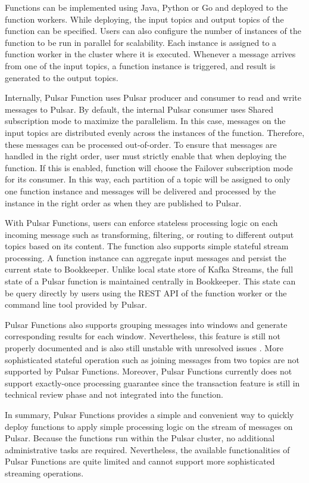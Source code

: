 Functions can be implemented using Java, Python or Go and deployed to the function workers. While deploying, the input topics and output topics of the function can be specified. Users can also configure the number of instances of the function to be run in parallel for scalability. Each instance is assigned to a function worker in the cluster where it is executed. Whenever a message arrives from one of the input topics, a function instance is triggered, and result is generated to the output topics. 

Internally, Pulsar Function uses Pulsar producer and consumer to read and write messages to Pulsar. By default, the internal Pulsar consumer uses Shared subscription mode to maximize the parallelism. In this case, messages on the input topics are distributed evenly across the instances of the function. Therefore, these messages can be processed out-of-order. To ensure that messages are handled in the right order, user must strictly enable that when deploying the function. If this is enabled, function will choose the Failover subscription mode for its consumer. In this way, each partition of a topic will be assigned to only one function instance and messages will be delivered and processed by the instance in the right order as when they are published to Pulsar.  

With Pulsar Functions, users can enforce stateless processing logic on each incoming message such as transforming, filtering, or routing to different output topics based on its content. The function also supports simple stateful stream processing. A function instance can aggregate input messages and persist the current state to Bookkeeper. Unlike local state store of Kafka Streams, the full state of a Pulsar function is maintained centrally in Bookkeeper. This state can be query directly by users using the REST API of the function worker or the command line tool provided by Pulsar.

Pulsar Functions also supports grouping messages into windows and generate corresponding results for each window. Nevertheless, this feature is still not properly documented and is also still unstable with unresolved issues \cite{pulsarfunctionissue}. More sophisticated stateful operation such as joining messages from two topics are not supported by Pulsar Functions. Moreover, Pulsar Functions currently does not support exactly-once processing guarantee since the transaction feature is still in technical review phase and not integrated into the function.

In summary, Pulsar Functions provides a simple and convenient way to quickly deploy functions to apply simple processing logic on the stream of messages on Pulsar. Because the functions run within the Pulsar cluster, no additional administrative tasks are required. Nevertheless, the available functionalities of Pulsar Functions are quite limited and cannot support more sophisticated streaming operations.

